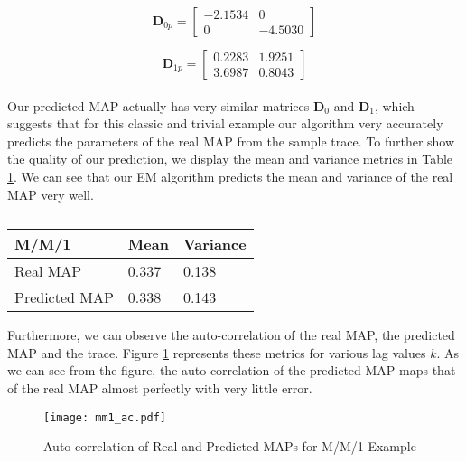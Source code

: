 \documentclass[a4paper,11pt,titlepage]{article}
\begin{document}
\begin{equation}
    \mathbf{D}_{0p} = \begin{bmatrix}
    -2.1534 & 0 \\
    0 & -4.5030
    \end{bmatrix}
    \label{eqn:map_mm1_d0_p}
\end{equation}

\begin{equation}
    \mathbf{D}_{1p} = \begin{bmatrix}
    0.2283 & 1.9251 \\
    3.6987 & 0.8043
    \end{bmatrix}
    \label{eqn:map_mm1_d1_p}
\end{equation} \\

Our predicted MAP actually has very similar matrices $\mathbf{D}_0$ and $\mathbf{D}_1$, which suggests that for this classic and trivial example our algorithm very accurately predicts the parameters of the real MAP from the sample trace. To further show the quality of our prediction, we display the mean and variance metrics in Table \ref{table:map_mm1_mean_var}. We can see that our EM algorithm predicts the mean and variance of the real MAP very well. \\
 
 
\begin{table}[h!]
\begin{center}
\begin{tabular}{|l|l|l|}
\hline
M/M/1 & Mean & Variance \\ \hline
Real MAP & 0.337 & 0.138 \\ \hline
Predicted MAP & 0.338 & 0.143 \\ \hline
\end{tabular}
\caption{}
\label{table:map_mm1_mean_var}
\end{center}
\end{table}

Furthermore, we can observe the auto-correlation of the real MAP, the predicted MAP and the trace. Figure \ref{fig:mm1_ac} represents these metrics for various lag values $k$. As we can see from the figure, the auto-correlation of the predicted MAP maps that of the real MAP almost perfectly with very little error. 
\begin{figure}[h!]
\begin{center}
\texttt{[image: mm1\_ac.pdf]}
\caption{Auto-correlation of Real and Predicted MAPs for M/M/1 Example}
\label{fig:mm1_ac}
\end{center}
\end{figure}
\end{document}
